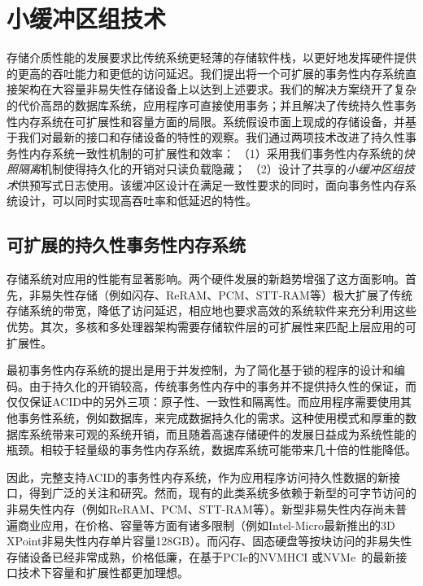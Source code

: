 \chapter{小缓冲区组技术}
\label{chap:sba}

存储介质性能的发展要求比传统系统更轻薄的存储软件栈，以更好地发挥硬件提供的更高的吞吐能力和更低的访问延迟。我们提出将一个可扩展的事务性内存系统直接架构在大容量非易失性存储设备上以达到上述要求。我们的解决方案绕开了复杂的代价高昂的数据库系统，应用程序可直接使用事务；并且解决了传统持久性事务性内存系统在可扩展性和容量方面的局限。系统假设市面上现成的存储设备，并基于我们对最新的接口和存储设备的特性的观察。我们通过两项技术改进了持久性事务性内存系统一致性机制的可扩展性和效率：
（1）采用我们事务性内存系统的\emph{快照隔离}机制使得持久化的开销对只读负载隐藏；
（2）设计了共享的\emph{小缓冲区组技术}供预写式日志使用。该缓冲区设计在满足一致性要求的同时，面向事务性内存系统设计，可以同时实现高吞吐率和低延迟的特性。

\section{可扩展的持久性事务性内存系统}

存储系统对应用的性能有显著影响。两个硬件发展的新趋势增强了这方面影响。首先，非易失性存储（例如闪存\cite{Chen:2009:UIC:1555349.1555371, 4804997}、ReRAM\cite{6327378, 7168603}、PCM\cite{Loke22062012,6176872,Raoux:2008:PRA,10.1109/MM.2010.24}、STT-RAM\cite{4443191,6557176}等）极大扩展了传统存储系统的带宽，降低了访问延迟，相应地也要求高效的系统软件来充分利用这些优势。其次，多核和多处理器架构需要存储软件层的可扩展性来匹配上层应用的可扩展性\cite{Zheng:2014:FDF:2685048.2685085,Kimura:2015:FOE:2723372.2746480}。

最初事务性内存系统的提出是用于并发控制，为了简化基于锁的程序的设计和编码。由于持久化的开销较高，传统事务性内存中的事务并不提供持久性的保证，而仅仅保证ACID中的另外三项：原子性、一致性和隔离性。而应用程序需要使用其他事务性系统，例如数据库，来完成数据持久化的需求。这种使用模式和厚重的数据库系统带来可观的系统开销，而且随着高速存储硬件的发展日益成为系统性能的瓶颈。相较于轻量级的事务性内存系统，数据库系统可能带来几十倍的性能降低\cite{Volos:2011:MLP:1950365.1950379,
Coburn:2011:NMP:1950365.1950380}。

因此，完整支持ACID的事务性内存系统，作为应用程序访问持久性数据的新接口，得到广泛的关注和研究\cite{Volos:2011:MLP:1950365.1950379,
Coburn:2011:NMP:1950365.1950380, Zhao:2013:KCP:2540708.2540744, 6828760}。然而，现有的此类系统多依赖于新型的可字节访问的非易失性内存（例如ReRAM、PCM、STT-RAM等）。新型非易失性内存尚未普遍商业应用，在价格、容量等方面有诸多限制（例如Intel-Micro最新推出的3D XPoint非易失性内存单片容量128GB）。而闪存、固态硬盘等按块访问的非易失性存储设备已经非常成熟，价格低廉，在基于PCIe的NVMHCI 或NVMe~\cite{nvme}的最新接口技术下容量和扩展性都更加理想。

